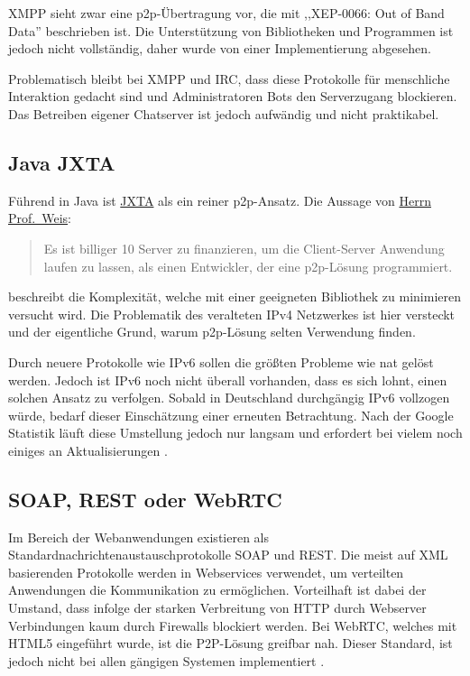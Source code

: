 \documentclass[oneside, ngerman, toc=bibliography,bibliography=totoc,listof=entryprefix, open=right,numbers=noenddot,fontsize=12pt]{scrbook}
\begin{document}
XMPP sieht zwar eine \acrshort{p2p}-Übertragung vor, die mit ,,XEP-0066: Out of Band Data''  beschrieben ist. Die Unterstützung von Bibliotheken und Programmen ist jedoch nicht vollständig, daher wurde von einer Implementierung abgesehen.

Problematisch bleibt bei XMPP und IRC, dass diese Protokolle für menschliche Interaktion gedacht sind und Administratoren Bots den Serverzugang blockieren. Das Betreiben eigener Chatserver ist jedoch aufwändig und nicht praktikabel.

 
\subsection{Java JXTA}
Führend in Java ist \href{https://jxta.kenai.com/}{{JXTA}} als ein reiner \acrshort{p2p}-Ansatz. Die Aussage von \href{http://www.vs.uni-due.de/}{Herrn Prof.\ Weis}:

\begin{quote}
Es ist billiger 10 Server zu finanzieren, um die Client-Server Anwendung laufen zu lassen, als einen Entwickler, der eine \acrshort{p2p}-Lösung programmiert.
\end{quote}
beschreibt die Komplexität, welche mit einer geeigneten Bibliothek zu minimieren versucht wird.
Die Problematik des veralteten IPv4 Netzwerkes ist hier versteckt und der eigentliche Grund, warum \acrshort{p2p}-Lösung selten Verwendung finden.

Durch neuere Protokolle wie IPv6 sollen die größten Probleme wie \acrshort{nat} gelöst werden.
Jedoch ist IPv6 noch nicht überall vorhanden, dass es sich lohnt, einen solchen Ansatz zu verfolgen.
Sobald in Deutschland durchgängig IPv6 vollzogen würde, bedarf dieser Einschätzung einer erneuten Betrachtung. Nach der Google Statistik läuft diese Umstellung jedoch nur langsam und erfordert bei vielem noch einiges an Aktualisierungen \cite{gstat}. 


\subsection{SOAP, REST oder WebRTC}
Im Bereich der Webanwendungen existieren als Standardnachrichtenaustauschprotokolle {SOAP} und {REST}.
Die meist auf {XML} basierenden Protokolle werden in Webservices verwendet, um verteilten Anwendungen die Kommunikation zu ermöglichen.
Vorteilhaft ist dabei der Umstand, dass infolge der starken Verbreitung von {HTTP} durch Webserver Verbindungen kaum durch Firewalls blockiert werden. 
Bei {WebRTC}, welches mit {HTML5} eingeführt wurde, ist die P2P-Lösung greifbar nah. Dieser Standard, ist jedoch nicht bei allen gängigen Systemen implementiert \cite{cani}.
\end{document}
